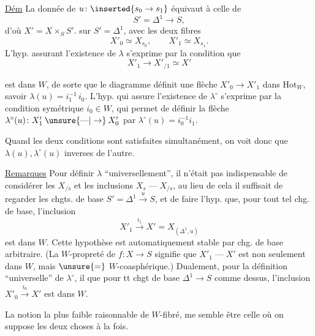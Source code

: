 \uline{Dém} La donnée de $u\colon\inserted{s_0\to s_1}$ équivaut à celle de
\[
S'=\mathbb{\Delta}^1\longrightarrow S,
\]
d'où $X'=X\times_S S'$. sur $S'=\mathbb{\Delta}^1$, avec les deux fibres
\[
X'_0\simeq X_{s_0},\qquad X'_1\simeq X_{s_1}.
\]
L'hyp. assurant l'existence de $\lambda$ s'exprime par la condition que
\[
X'_1\longrightarrow X'_{/1}\simeq X'
\]


est dans $W$, de sorte que le diagramme
définit une flèche  $X'_0\to X'_1$\unsure{,} dans $\mathrm{Hot}_W$, savoir $\lambda(u)=i_1^{-1}\,i_0$. L'hyp. qui assure l'existence de $\lambda^\circ$ s'exprime par la condition symétrique $i_0\in W$, qui permet de définir la flèche $\lambda^\circ(u)\colon X'_1\mathbin{\unsure{\text{---}|\to}}X'_0$ par $\lambda^\circ(u)=i_0^{-1}i_1$.

Quand les deux conditions sont satisfaites simultanément, on voit donc que $\lambda(u),\lambda^\circ(u)$  inverses  de l'autre.

\uline{Remarques} Pour définir $\lambda$ ``universellement'', il n'était pas indispensable de considérer les $X_{/s}$ et les inclusions $X_s\mathbin{\text{---}}X_{/s}$, au lieu de cela il suffisait de regarder les chgts. de base $S'=\mathbb{\Delta}^1\xrightarrow{u}S$, et de faire l'hyp. que, pour tout tel chg. de base, l'inclusion
\[
X'_1\xrightarrow{i_1}X'=X_{(\mathbb{\Delta}^{1},u)}
\]
est dans $W$. Cette hypothèse est automatiquement stable par chg. de base arbitraire. (La $W$-propreté de $f\colon X\to S$ signifie que $X'_1\mathbin{\text{---}}X'$ est non seulement dans $W$, mais $\unsure{=}$ $W$-coasphérique.) Dualement, pour la définition ``universelle'' de $\lambda^\circ$, il  que pour tt chgt de base $\mathbb{\Delta}^1\to S$ comme dessus, l'inclusion $X'_0\xrightarrow{i_0}X'$ est dans $W$.


 La notion la plus faible raisonnable de $W$-fibré, me semble être celle où on suppose les deux choses à la fois.

